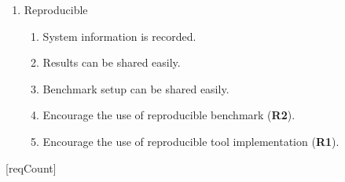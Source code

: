 \begin{enumerate}[noitemsep]
    \item Reproducible
    \begin{enumerate}[noitemsep]
        \item System information is recorded.
        \item Results can be shared easily.
        \item Benchmark setup can be shared easily.
        \item Encourage the use of reproducible benchmark (\textbf{R2}).
        \item Encourage the use of reproducible tool implementation (\textbf{R1}).
    \end{enumerate}
\end{enumerate}

[reqCount]
\newcommand{\reqLabel}[1]{
    \setcounter{reqFactorCount}{0}
    \addtocounter{reqCount}{1}
    \arabic{reqCount}.
    #1
}
\newcommand{\reqFactor}[1]{
    \addtocounter{reqFactorCount}{1}
    (\alph{reqFactorCount}) #1
}









